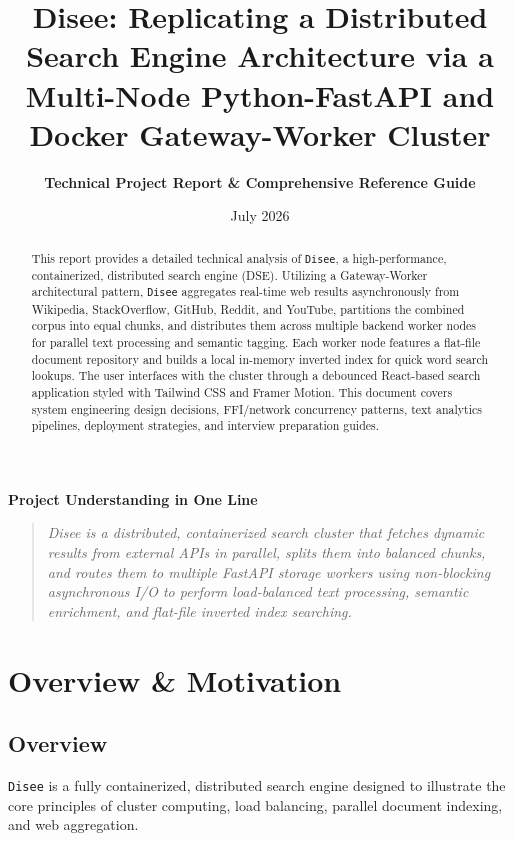 \documentclass[11pt,a4paper]{article}
\title{\textbf{Disee: Replicating a Distributed Search Engine Architecture via a Multi-Node Python-FastAPI and Docker Gateway-Worker Cluster}}
\author{\textbf{Technical Project Report \& Comprehensive Reference Guide}}
\date{July 2026}
\begin{document}
\maketitle

\begin{abstract}
This report provides a detailed technical analysis of \texttt{Disee}, a high-performance, containerized, distributed search engine (DSE). Utilizing a Gateway-Worker architectural pattern, \texttt{Disee} aggregates real-time web results asynchronously from Wikipedia, StackOverflow, GitHub, Reddit, and YouTube, partitions the combined corpus into equal chunks, and distributes them across multiple backend worker nodes for parallel text processing and semantic tagging. Each worker node features a flat-file document repository and builds a local in-memory inverted index for quick word search lookups. The user interfaces with the cluster through a debounced React-based search application styled with Tailwind CSS and Framer Motion. This document covers system engineering design decisions, FFI/network concurrency patterns, text analytics pipelines, deployment strategies, and interview preparation guides.
\end{abstract}

\begin{center}
\small\textbf{Project Understanding in One Line}
\end{center}
\begin{quote}
\small\noindent\textit{Disee is a distributed, containerized search cluster that fetches dynamic results from external APIs in parallel, splits them into balanced chunks, and routes them to multiple FastAPI storage workers using non-blocking asynchronous I/O to perform load-balanced text processing, semantic enrichment, and flat-file inverted index searching.}
\end{quote}

\newpage
\tableofcontents
\newpage

\section{Overview \& Motivation}

\subsection{Overview}
\texttt{Disee} is a fully containerized, distributed search engine designed to illustrate the core principles of cluster computing, load balancing, parallel document indexing, and web aggregation. 
\end{document}
